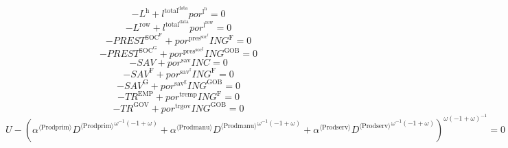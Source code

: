 \begin{equation}
-L^{\mathrm{h}} + {l^{\mathrm{total}^{\mathrm{data}}}} {{p\!o\!r}^{\mathrm{l}^{\mathrm{h}}}} = 0
\end{equation}
\begin{equation}
-L^{\mathrm{row}} + {l^{\mathrm{total}^{\mathrm{data}}}} {{p\!o\!r}^{\mathrm{l}^{\mathrm{row}}}} = 0
\end{equation}
\begin{equation}
-{P\!R\!E\!S\!T}^{\mathrm{SOC}^{\mathrm{F}}} + {{p\!o\!r}^{\mathrm{pres}^{\mathrm{soc}^{\mathrm{f}}}}} {{I\!N\!G}^{\mathrm{F}}} = 0
\end{equation}
\begin{equation}
-{P\!R\!E\!S\!T}^{\mathrm{SOC}^{\mathrm{G}}} + {{p\!o\!r}^{\mathrm{pres}^{\mathrm{soc}^{\mathrm{g}}}}} {{I\!N\!G}^{\mathrm{GOB}}} = 0
\end{equation}
\begin{equation}
-{S\!A\!V} + {{p\!o\!r}^{\mathrm{sav}}} {{I\!N\!C}} = 0
\end{equation}
\begin{equation}
-{S\!A\!V}^{\mathrm{F}} + {{p\!o\!r}^{\mathrm{sav}^{\mathrm{f}}}} {{I\!N\!G}^{\mathrm{F}}} = 0
\end{equation}
\begin{equation}
-{S\!A\!V}^{\mathrm{G}} + {{p\!o\!r}^{\mathrm{sav}^{\mathrm{g}}}} {{I\!N\!G}^{\mathrm{GOB}}} = 0
\end{equation}
\begin{equation}
-{T\!R}^{\mathrm{EMP}} + {{p\!o\!r}^{\mathrm{tremp}}} {{I\!N\!G}^{\mathrm{F}}} = 0
\end{equation}
\begin{equation}
-{T\!R}^{\mathrm{GOV}} + {{p\!o\!r}^{\mathrm{trgov}}} {{I\!N\!G}^{\mathrm{GOB}}} = 0
\end{equation}
\begin{equation}
U - \left({{\alpha}^{\langle \mathrm{\mathrm{Prodprim}}\rangle}} {{{D}^{\langle \mathrm{Prodprim}\rangle}}^{{\omega}^{-1} \left(-1 + \omega\right)}} + {{\alpha}^{\langle \mathrm{\mathrm{Prodmanu}}\rangle}} {{{D}^{\langle \mathrm{Prodmanu}\rangle}}^{{\omega}^{-1} \left(-1 + \omega\right)}} + {{\alpha}^{\langle \mathrm{\mathrm{Prodserv}}\rangle}} {{{D}^{\langle \mathrm{Prodserv}\rangle}}^{{\omega}^{-1} \left(-1 + \omega\right)}}\right)^{{\omega} \left(-1 + \omega\right)^{-1}} = 0
\end{equation}
